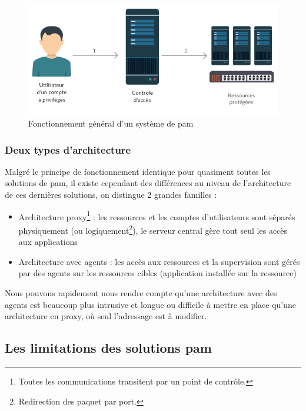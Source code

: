 \begin{figure}[!ht]
    \center
    \includegraphics[width=\textwidth]{./images/Schema_ultra_light_PAM.png}
    \caption{Fonctionnement général d'un système de \gls{pam}}
\end{figure}

\subsubsection{Deux types d'architecture}
Malgré le principe de fonctionnement identique pour quasiment toutes les solutions de \gls{pam}, il existe cependant des différences au niveau de l'architecture de ces dernières solutions, on distingue 2 grandes familles :
\begin{itemize}
	\item Architecture proxy\footnote{Toutes les communications transitent par un point de contrôle.} : les ressources et les comptes d'utilisateurs sont séparés physiquement (ou logiquement\footnote{Redirection des paquet  par port.}), le serveur central gère tout seul les accès aux applications
	\item Architecture avec agents : les accès aux ressources et la supervision sont gérés par des agents sur les ressources cibles (application installée sur la ressource)
\end{itemize}
Nous pouvons rapidement nous rendre compte qu'une architecture avec des agents est beaucoup plus intrusive et longue ou difficile à mettre en place qu'une architecture en proxy, où seul l'adressage est à modifier.

\subsection{Les limitations des solutions \gls{pam}}

